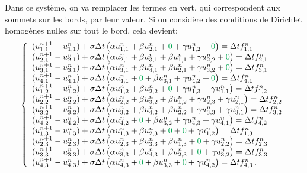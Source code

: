 \documentclass[11pt]{article}
\begin{document}
Dans ce système, on va remplacer les termes en vert, qui correspondent aux sommets sur les bords, par leur valeur. Si on considère des conditions de Dirichlet homogènes nulles sur tout le bord, cela devient:
\begin{equation}
\left\{
\begin{array}{l}
(u^{n+1}_{1,1}-u^{n}_{1,1}) + \sigma\Delta t\left(\alpha u^{n}_{1,1} + \beta u^{n}_{2,1} +  {\color{Green}0} +  \gamma u^{n}_{1,2} +  {\color{Green}0}\right) = \Delta t f^{n}_{1,1} \\ 
(u^{n+1}_{2,1}-u^{n}_{2,1}) + \sigma\Delta t\left(\alpha u^{n}_{2,1} + \beta u^{n}_{3,1} +  \beta u^{n}_{1,1} +  \gamma u^{n}_{2,2} +  {\color{Green}0}\right) = \Delta t f^{n}_{2,1} \\ 
(u^{n+1}_{3,1}-u^{n}_{3,1}) + \sigma\Delta t\left(\alpha u^{n}_{3,1} + \beta u^{n}_{4,1} +  \beta u^{n}_{2,1} +  \gamma u^{n}_{3,2} +  {\color{Green}0}\right) = \Delta t f^{n}_{3,1} \\ 
(u^{n+1}_{4,1}-u^{n}_{4,1}) + \sigma\Delta t\left(\alpha u^{n}_{4,1} +  {\color{Green}0} +  \beta u^{n}_{3,1} +  \gamma u^{n}_{4,2} +  {\color{Green}0}\right) = \Delta t f^{n}_{4,1} \\ 
(u^{n+1}_{1,2}-u^{n}_{1,2}) + \sigma\Delta t\left(\alpha u^{n}_{1,2} + \beta u^{n}_{2,2} +   {\color{Green}0} +  \gamma u^{n}_{1,3} +  \gamma u^{n}_{1,1}\right) = \Delta t f^{n}_{1,2} \\ 
(u^{n+1}_{2,2}-u^{n}_{2,2}) + \sigma\Delta t\left(\alpha u^{n}_{2,2} + \beta u^{n}_{3,2} +  \beta u^{n}_{1,2} +  \gamma u^{n}_{2,3} +  \gamma u^{n}_{2,1}\right) = \Delta t f^{n}_{2,2} \\ 
(u^{n+1}_{3,2}-u^{n}_{3,2}) + \sigma\Delta t\left(\alpha u^{n}_{3,2} + \beta u^{n}_{4,2} +  \beta u^{n}_{2,2} +  \gamma u^{n}_{3,3} +  \gamma u^{n}_{3,1}\right) = \Delta t f^{n}_{3,2} \\ 
(u^{n+1}_{4,2}-u^{n}_{4,2}) + \sigma\Delta t\left(\alpha u^{n}_{4,2} +  {\color{Green}0} +  \beta u^{n}_{3,2} +  \gamma u^{n}_{4,3} +  \gamma u^{n}_{4,1}\right) = \Delta t f^{n}_{4,2} \\ 
(u^{n+1}_{1,3}-u^{n}_{1,3}) + \sigma\Delta t\left(\alpha u^{n}_{1,3} + \beta u^{n}_{2,3} +  {\color{Green}0} +  {\color{Green}0} +  \gamma u^{n}_{1,2}\right) = \Delta t f^{n}_{1,3} \\ 
(u^{n+1}_{2,3}-u^{n}_{2,3}) + \sigma\Delta t\left(\alpha u^{n}_{2,3} + \beta u^{n}_{3,3} +  \beta u^{n}_{1,3} +  {\color{Green}0} +  \gamma u^{n}_{2,2}\right) = \Delta t f^{n}_{2,3} \\ 
(u^{n+1}_{3,3}-u^{n}_{3,3}) + \sigma\Delta t\left(\alpha u^{n}_{3,3} + \beta u^{n}_{4,3} +  \beta u^{n}_{2,3} +  {\color{Green}0} +  \gamma u^{n}_{3,2}\right) = \Delta t f^{n}_{3,3} \\ 
(u^{n+1}_{4,3}-u^{n}_{4,3}) + \sigma\Delta t\left(\alpha u^{n}_{4,3} +  {\color{Green}0} +  \beta u^{n}_{3,3} +  {\color{Green}0} +  \gamma u^{n}_{4,2}\right) = \Delta t f^{n}_{4,3} \,.
\end{array}
\right.
\label{eq:system2}
\end{equation}
\end{document}
